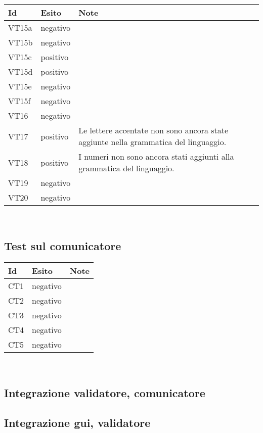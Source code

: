 \begin{center}
\begin{tabular}{|p{1cm}|p{1.6cm}|p{8.4cm}|} \hline
\textbf{Id} & \textbf{Esito} & \textbf{Note} \\ \hline
VT15a & negativo & \\ \hline
VT15b & negativo & \\ \hline
VT15c & positivo & \\ \hline
VT15d & positivo & \\ \hline
VT15e & negativo & \\ \hline
VT15f & negativo & \\ \hline
VT16 & negativo & \\ \hline
VT17 & positivo & Le lettere accentate non sono ancora state aggiunte nella grammatica del linguaggio.\\ \hline
VT18 & positivo & I numeri non sono ancora stati aggiunti alla grammatica del linguaggio.\\ \hline
VT19 & negativo & \\ \hline
VT20 & negativo & \\ \hline
\end{tabular} \\
\end{center}

\subsection{Test sul comunicatore}
\begin{center}
\begin{tabular}{|p{1cm}|p{1.6cm}|p{8.4cm}|} \hline
\textbf{Id} & \textbf{Esito} & \textbf{Note} \\ \hline
CT1 & negativo & \\ \hline
CT2 & negativo & \\ \hline
CT3 & negativo & \\ \hline
CT4 & negativo & \\ \hline
CT5 & negativo & \\ \hline
\end{tabular} \\
\end{center}
\subsection{Integrazione validatore, comunicatore}
\subsection{Integrazione gui, validatore}
